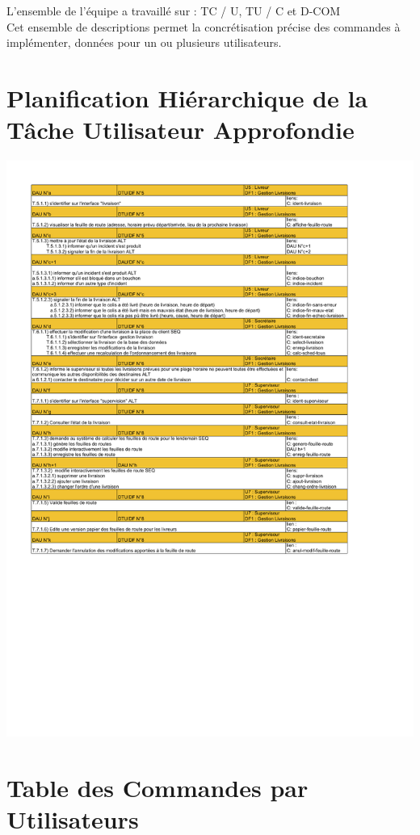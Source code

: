 \documentclass{report}
\begin{document}
L'ensemble de l'équipe a travaillé sur : TC / U, TU / C et D-COM\\

Cet ensemble de descriptions permet la concrétisation précise des commandes à implémenter, données pour un ou plusieurs utilisateurs.

\pagebreak

\section{Planification Hiérarchique de la Tâche Utilisateur Approfondie}

\includegraphics[scale = 0.85]{images/DAU.pdf}

\section{Table des Commandes par Utilisateurs}
\end{document}
